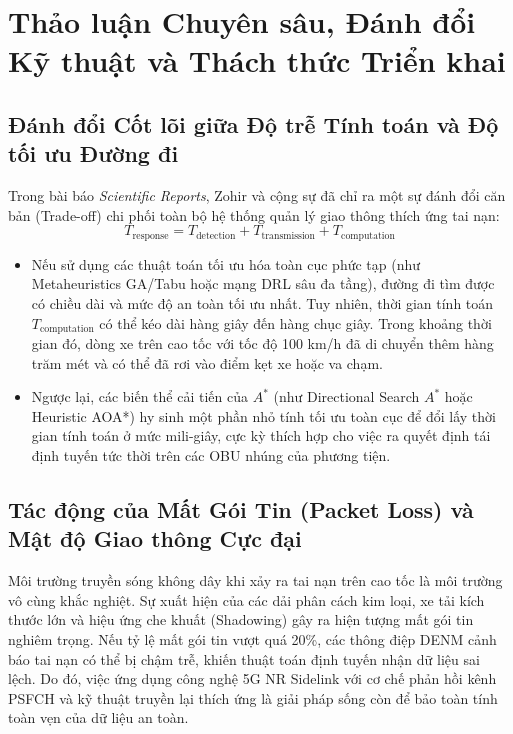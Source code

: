 \documentclass[a4paper]{article}
\begin{document}
\clearpage

\section{Thảo luận Chuyên sâu, Đánh đổi Kỹ thuật và Thách thức Triển khai}

\subsection{Đánh đổi Cốt lõi giữa Độ trễ Tính toán và Độ tối ưu Đường đi}
Trong bài báo \textit{Scientific Reports}, Zohir và cộng sự đã chỉ ra một sự đánh đổi căn bản (Trade-off) chi phối toàn bộ hệ thống quản lý giao thông thích ứng tai nạn:
\begin{equation}
    T_{\text{response}} = T_{\text{detection}} + T_{\text{transmission}} + T_{\text{computation}}
\end{equation}
\begin{itemize}
    \item Nếu sử dụng các thuật toán tối ưu hóa toàn cục phức tạp (như Metaheuristics GA/Tabu hoặc mạng DRL sâu đa tầng), đường đi tìm được có chiều dài và mức độ an toàn tối ưu nhất. Tuy nhiên, thời gian tính toán $T_{\text{computation}}$ có thể kéo dài hàng giây đến hàng chục giây. Trong khoảng thời gian đó, dòng xe trên cao tốc với tốc độ 100 km/h đã di chuyển thêm hàng trăm mét và có thể đã rơi vào điểm kẹt xe hoặc va chạm.
    \item Ngược lại, các biến thể cải tiến của $A^*$ (như Directional Search $A^*$ hoặc Heuristic AOA*) hy sinh một phần nhỏ tính tối ưu toàn cục để đổi lấy thời gian tính toán ở mức mili-giây, cực kỳ thích hợp cho việc ra quyết định tái định tuyến tức thời trên các OBU nhúng của phương tiện.
\end{itemize}

\subsection{Tác động của Mất Gói Tin (Packet Loss) và Mật độ Giao thông Cực đại}
Môi trường truyền sóng không dây khi xảy ra tai nạn trên cao tốc là môi trường vô cùng khắc nghiệt. Sự xuất hiện của các dải phân cách kim loại, xe tải kích thước lớn và hiệu ứng che khuất (Shadowing) gây ra hiện tượng mất gói tin nghiêm trọng. Nếu tỷ lệ mất gói tin vượt quá 20\%, các thông điệp DENM cảnh báo tai nạn có thể bị chậm trễ, khiến thuật toán định tuyến nhận dữ liệu sai lệch. Do đó, việc ứng dụng công nghệ 5G NR Sidelink với cơ chế phản hồi kênh PSFCH và kỹ thuật truyền lại thích ứng là giải pháp sống còn để bảo toàn tính toàn vẹn của dữ liệu an toàn.
\end{document}
